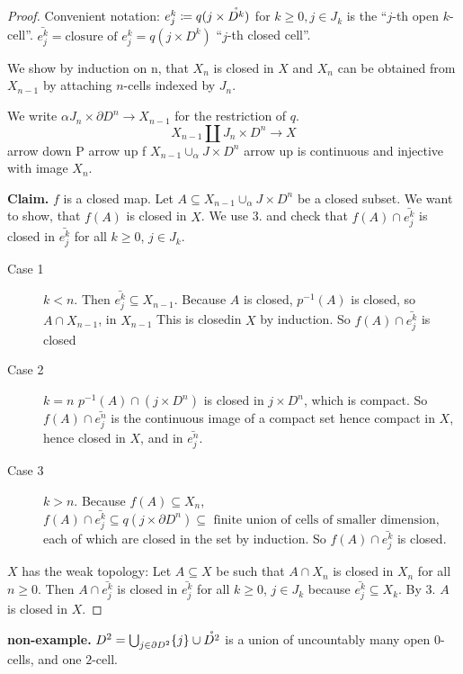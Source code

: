 \documentclass{TemplateLecture}
\begin{document}
\begin{proof}
    Convenient notation: \(e_j^k \coloneq q(j\times \mathring{D^k})\) for \(k \geq 0, j \in J_k\) is the \enquote{\(j\)-th open \(k\)-cell}.
    \(\bar{e_j^k} = \text{closure of } e_j^k = q(j \times D^k)\) \enquote{\(j\)-th closed cell}.

    We show by induction on n, that \(X_n\) is closed in \(X\) and \(X_n\) can be obtained from \(X_{n-1}\) by attaching \(n\)-cells indexed by \(J_n\).

    We write \(\alpha J_n\times \partial D^n \to X_{n-1}\) for the restriction of \(q\).
    \[X_{n-1} \amalg J_n \times D^n \to X\]%
    arrow down P        arrow up f
    \(X_{n-1} \cup_\alpha J\times D^n\)
    arrow up is continuous and injective with image \(X_n\).

    \textbf{Claim.} \(f\) is a closed map.
    Let \(A \subseteq X_{n-1} \cup_\alpha J\times D^n\) be a closed subset. We want to show, that \(f(A)\) is closed in \(X\). We use 3. and check that \(f(A) \cap \bar{e_j^k}\) is closed in \(\bar{e_j^k}\) for all \(k \geq 0\), \(j\in J_k\).
    \begin{description}
        \item[Case 1] \(k < n\). Then \(\bar{e_j^k} \subseteq X_{n-1}\). Because \(A\) is closed, \(p^{-1}(A)\) is closed, so \(A\cap X_{n-1}\), in \(X_{n-1}\) This is closedin \(X\) by induction. So \(f(A) \cap \bar{e_j^k}\) is closed
        \item[Case 2] \(k = n\) \(p^{-1}(A) \cap (j \times D^n)\) is closed in \(j\times D^n\), which is compact. So \(f(A) \cap \bar{e_j^n}\) is the continuous image of a compact set hence compact in \(X\), hence closed in \(X\), and in \(\bar{e_j^n}\).
        \item[Case 3] \(k > n\). Because \(f(A) \subseteq X_n\), \(f(A) \cap \bar{e_j^k} \subseteq q(j\times \partial D^n) \subseteq \text{ finite union of cells of smaller dimension,}\) each of which are closed in the set by induction. So \(f(A) \cap \bar{e_j^k}\) is closed.
    \end{description}
    \(X\) has the weak topology: Let \(A \subseteq X\) be such that \(A \cap X_n\) is closed in \(X_n\) for all \(n \geq 0\). Then \(A \cap \bar{e_j^k}\) is closed in \(\bar{e_j^k}\) for all \(k \geq 0\), \(j \in J_k\) because \(\bar{e_j^k} \subseteq X_k\). By 3. \(A\) is closed in \(X\).
\end{proof}

\textbf{non-example.} \(D^2 = \bigcup_{j \in \partial D^2} \{j\} \cup \mathring{D^2}\) is a union of uncountably many open \(0\)-cells, and one \(2\)-cell.
\end{document}
